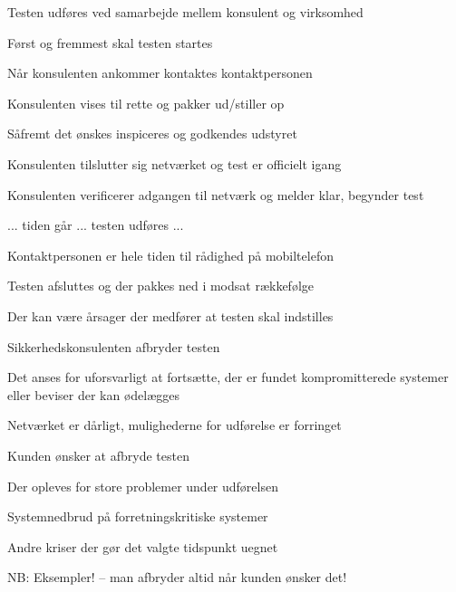 \documentclass[20pt,landscape,a4paper,footrule]{foils}
\begin{document}
\begin{list1}
\item Testen udføres ved samarbejde mellem konsulent og virksomhed
\item Først og fremmest skal testen startes
\begin{list2}
\item Når konsulenten ankommer kontaktes kontaktpersonen
\item Konsulenten vises til rette og pakker ud/stiller op
\item Såfremt det ønskes inspiceres og godkendes udstyret
\item Konsulenten tilslutter sig netværket og test er officielt igang
\item Konsulenten verificerer adgangen til netværk og melder klar,
  begynder test
\end{list2}
\item ... tiden går ... testen udføres ...
\item Kontaktpersonen er hele tiden til rådighed på mobiltelefon
\item Testen afsluttes og der pakkes ned i modsat rækkefølge
\end{list1}



\begin{list1}
\item Der kan være årsager der medfører at testen skal indstilles
\item Sikkerhedskonsulenten afbryder testen
\begin{list2}
\item Det anses for uforsvarligt at fortsætte, der er fundet
  kompromitterede systemer eller beviser der kan ødelægges
\item Netværket er dårligt, mulighederne for udførelse er forringet
\end{list2}
\item Kunden ønsker at afbryde testen
\begin{list2}
\item Der opleves for store problemer under udførelsen
\item Systemnedbrud på forretningskritiske systemer
\item Andre kriser der gør det valgte tidspunkt uegnet
\end{list2}
\item NB: Eksempler! -- man afbryder altid når kunden ønsker det!
\end{list1}
\end{document}
